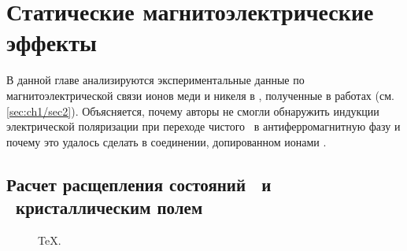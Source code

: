 \chapter{Статические магнитоэлектрические эффекты}\label{ch:ch2}

В данной главе анализируются экспериментальные данные по магнитоэлектрической связи ионов меди и никеля в \ncbo, полученные в работах \cite{Nenert2007, Khan2013} (см. \cref{sec:ch1/sec2}). Объясняется, почему авторы \cite{Nenert2007} не смогли обнаружить индукции электрической поляризации при переходе чистого \cbo\ в антиферромагнитную фазу и почему это удалось сделать в соединении, допированном ионами \niIon.

\section{Расчет расщепления состояний \cud\ и \nif\ кристаллическим полем}\label{sec:ch2/sec1}

\begin{figure}[ht]
    \caption{TeX.}\label{fig:latex}
\end{figure}



\FloatBarrier
